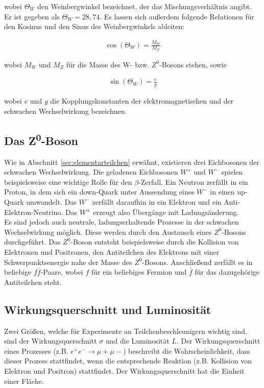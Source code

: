 wobei $\Theta_W$ den Weinbergwinkel bezeichnet, der das Mischungsverhältnis angibt. Er ist gegeben als $\Theta_W = 28,74$. Es lassen sich außerdem folgende Relationen für den Kosinus und den Sinus des Weinbergwinkels ableiten:

\begin{align}
\cos(\Theta_W) = \frac{M_W}{M_Z}
\end{align}

wobei $M_W$ und $M_Z$ für die Masse des W- bzw. $Z^{0}$-Bosons stehen, sowie

\begin{align}
\sin(\Theta_W)=\frac{e}{g}
\end{align}

wobei $e$ und $g$ die Kopplungskonstanten der elektromagnetischen und der schwachen Wechselwirkung bezeichnen. \cite{jakobs}

\subsection{Das Z\textsuperscript0-Boson}

Wie in Abschnitt \ref{sec:elementarteilchen} erwähnt, existieren drei Eichbosonen der schwachen Wechselwirkung. Die geladenen Eichbosonen $W^+$ und $W^-$ spielen beispielsweise eine wichtige Rolle für den $\beta$-Zerfall. Ein Neutron zerfällt in ein Proton, in dem sich ein down-Quark unter Aussendung eines $W^-$ in einen up-Quark umwandelt. Das $W^-$ zerfällt daraufhin in ein Elektron und ein Anti-Elektron-Neutrino. Das $W^\pm$ erzeugt also Übergänge mit Ladungsänderung.\\

Es sind jedoch auch neutrale, ladungserhaltende Prozesse in der schwachen Wechselwirkung möglich. Diese werden durch den Austausch eines $Z^0$-Bosons durchgeführt. Das $Z^0$-Boson entsteht beispielsweise durch die Kollision von Elektronen und Positronen, den Antiteilchen des Elektrons mit einer Schwerpunktsenergie nahe der Masse des $Z^0$-Bosons. Anschließend zerfällt es in beliebige $f\bar{f}$-Paare, wobei $f$ für ein beliebiges Fermion und $\bar{f}$ für das dazugehörige Antiteilchen steht. \cite{griffiths}


\subsection{Wirkungsquerschnitt und Luminosität}

Zwei Größen, welche für Experimente an Teilchenbeschleunigern wichtig sind, sind der Wirkungsquerschnitt $\sigma$ und die Luminosität $L$. Der Wirkungsquerschnitt eines Prozesses (z.B. $e^+e^-\rightarrow\mu+\mu-$) beschreibt die Wahrscheinlichkeit, dass dieser Prozess stattfindet, wenn die entsprechende Reaktion (z.B. Kollision von Elektron und Positron) stattfindet. Der Wirkungsquerschnitt hat die Einheit einer Fläche.\\


